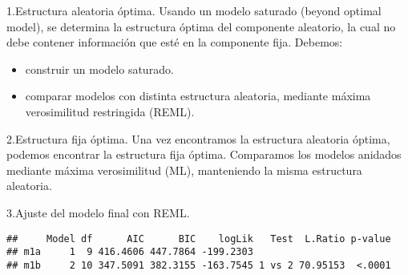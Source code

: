 \documentclass[
]{article}
\newenvironment{Shaded}{\begin{snugshade}}{\end{snugshade}}
\newcommand{\AttributeTok}[1]{\textcolor[rgb]{0.13,0.29,0.53}{#1}}
\newcommand{\CommentTok}[1]{\textcolor[rgb]{0.56,0.35,0.01}{\textit{#1}}}
\newcommand{\DecValTok}[1]{\textcolor[rgb]{0.00,0.00,0.81}{#1}}
\newcommand{\DocumentationTok}[1]{\textcolor[rgb]{0.56,0.35,0.01}{\textbf{\textit{#1}}}}
\newcommand{\FunctionTok}[1]{\textcolor[rgb]{0.13,0.29,0.53}{\textbf{#1}}}
\newcommand{\NormalTok}[1]{#1}
\newcommand{\OtherTok}[1]{\textcolor[rgb]{0.56,0.35,0.01}{#1}}
\newcommand{\SpecialCharTok}[1]{\textcolor[rgb]{0.81,0.36,0.00}{\textbf{#1}}}
\newcommand{\StringTok}[1]{\textcolor[rgb]{0.31,0.60,0.02}{#1}}
\begin{document}
1.Estructura aleatoria óptima. Usando un modelo saturado (beyond optimal
model), se determina la estructura óptima del componente aleatorio, la
cual no debe contener información que esté en la componente fija.
Debemos:

\begin{itemize}
\item
  construir un modelo saturado.
\item
  comparar modelos con distinta estructura aleatoria, mediante máxima
  verosimilitud restringida (REML).
\end{itemize}

2.Estructura fija óptima. Una vez encontramos la estructura aleatoria
óptima, podemos encontrar la estructura fija óptima. Comparamos los
modelos anidados mediante máxima verosimilitud (ML), manteniendo la
misma estructura aleatoria.

3.Ajuste del modelo final con REML.

\begin{Shaded}
\end{Shaded}

\begin{verbatim}
##     Model df      AIC      BIC    logLik   Test  L.Ratio p-value
## m1a     1  9 416.4606 447.7864 -199.2303                        
## m1b     2 10 347.5091 382.3155 -163.7545 1 vs 2 70.95153  <.0001
\end{verbatim}
\end{document}
